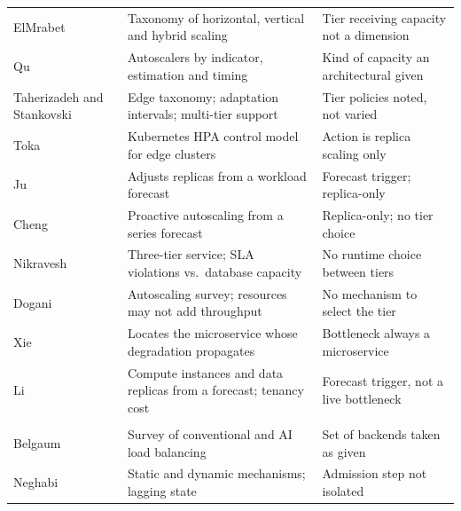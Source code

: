 ﻿\documentclass[12pt,reqno,twoside]{amsbook}
\begin{document}
{\begin{table}[H]
\begin{tabular}{p{} p{} p{}}
        ElMrabet~\parencite{ElMrabet2025ComprehensiveSurveyTaxonomyAutoscalingTechniques} & Taxonomy of horizontal, vertical and hybrid scaling & Tier receiving capacity not a dimension \\
        Qu~\parencite{Qu2018AutoScalingWebApplicationsClouds} & Autoscalers by indicator, estimation and timing & Kind of capacity an architectural given \\
        Taherizadeh and Stankovski~\parencite{Taherizadeh2017AutoScalingApplicationsEdgeComputing} & Edge taxonomy; adaptation intervals; multi-tier support & Tier policies noted, not varied \\
        Toka~\parencite{Toka2021MachineLearningScalingManagementKubernetes} & Kubernetes HPA control model for edge clusters & Action is replica scaling only \\
        Ju~\parencite{Ju2021ProactiveAutoscalingEdgeComputingSystems} & Adjusts replicas from a workload forecast & Forecast trigger; replica-only \\
        Cheng~\parencite{Cheng2023ProScaleProactiveAutoscalingMicroserviceTime} & Proactive autoscaling from a series forecast & Replica-only; no tier choice \\
        Nikravesh~\parencite{Nikravesh2017ImpactDatabaseLayerAutoScaling} & Three-tier service; SLA violations vs.\ database capacity & No runtime choice between tiers \\
        Dogani~\parencite{Dogani2023AutoScalingTechniquesContainerCloud} & Autoscaling survey; resources may not add throughput & No mechanism to select the tier \\
        Xie~\parencite{Xie2024PBScalerBottleneckAwareAutoscalingFramework} & Locates the microservice whose degradation propagates & Bottleneck always a microservice \\
        Li~\parencite{Li2020HeterogeneityAwareElasticProvisioningCloud} & Compute instances and data replicas from a forecast; tenancy cost & Forecast trigger, not a live bottleneck \\
        \addlinespace[1pt]
        \multicolumn{3}{l}{\textit{Load balancing and admission (5)}} \\
        Belgaum~\parencite{Belgaum2020SystematicReviewLoadBalancingTechniques} & Survey of conventional and AI load balancing & Set of backends taken as given \\
        Neghabi~\parencite{Neghabi2018LoadBalancingMechanismsSoftwareDefined} & Static and dynamic mechanisms; lagging state & Admission step not isolated \\

\end{tabular}
\end{table}}
\end{document}
